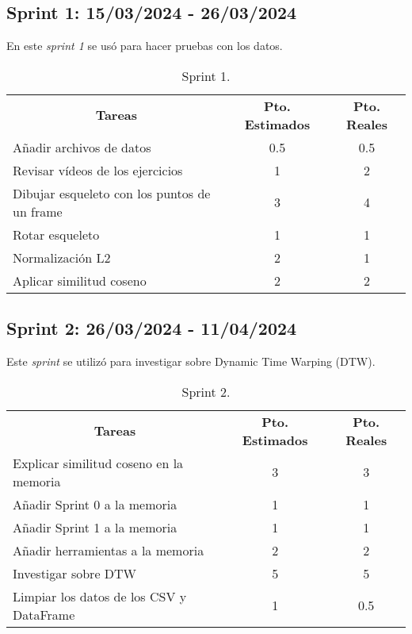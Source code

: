 \subsection{Sprint 1: 15/03/2024 - 26/03/2024}
En este \textit{sprint 1} se usó para hacer pruebas con los datos.

\begin{table}[H]
	\centering
	\begin{tabular}{lcc}
		\multicolumn{1}{c}{\textbf{Tareas}} & \textbf{Pto. Estimados} & \textbf{Pto. Reales}\\
		Añadir archivos de datos & 0.5 & 0.5 \\
		Revisar vídeos de los ejercicios & 1 & 2 \\
		Dibujar esqueleto con los puntos de un frame & 3 & 4 \\
		Rotar esqueleto & 1 & 1 \\
		Normalización L2 & 2 & 1 \\
		Aplicar similitud coseno & 2 & 2 \\
		
	\end{tabular}
	\caption{Sprint 1.}
	\label{sprint1}
\end{table}

\subsection{Sprint 2: 26/03/2024 - 11/04/2024}
Este \textit{sprint} se utilizó para investigar sobre Dynamic Time Warping (DTW).

\begin{table}[H]
	\begin{tabular}{lcc}
	\multicolumn{1}{c}{\textbf{Tareas}} & \textbf{Pto. Estimados} & \textbf{Pto. Reales}\\
		Explicar similitud coseno en la memoria & 3 & 3 \\
		Añadir Sprint 0 a la memoria & 1 & 1 \\
		Añadir Sprint 1 a la memoria & 1 & 1 \\
		Añadir herramientas a la memoria & 2 & 2 \\
		Investigar sobre DTW & 5 & 5 \\
		Limpiar los datos de los CSV y DataFrame & 1 & 0.5 \\

	\end{tabular}
	\caption{Sprint 2.}
	\label{sprint2}
\end{table}

